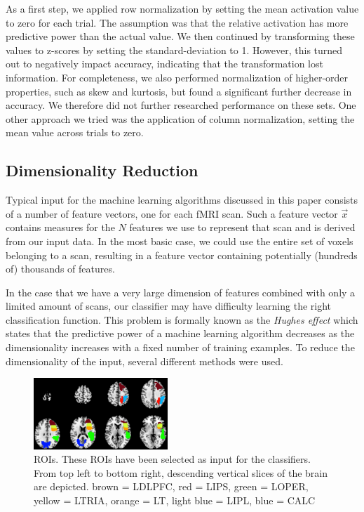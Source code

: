 \documentclass[preprint,journal,11pt]{vgtc}
\begin{document}
As a first step, we applied row normalization by setting the mean activation value to zero for each trial. The assumption was that the relative activation has more predictive power than the actual value. We then continued by transforming these values to z-scores by setting the standard-deviation to 1. However, this turned out to negatively impact accuracy, indicating that the transformation lost information. For completeness, we also performed normalization of higher-order properties, such as skew and kurtosis, but found a significant further decrease in accuracy. We therefore did not further researched performance on these sets. One other approach we tried was the application of column normalization, setting the mean value across trials to zero. 

\subsection{Dimensionality Reduction}
\label{sec:dimensionalityReduction}

Typical input for the machine learning algorithms discussed in this paper consists of a number of feature vectors, one for each fMRI scan. Such a feature vector $\vec{x}$ contains measures for the $N$ features we use to represent that scan and is derived from our input data. In the most basic case, we could use the entire set of voxels belonging to a scan, resulting in a feature vector containing potentially (hundreds of) thousands of features.

In the case that we have a very large dimension of features combined with only a limited amount of scans, our classifier may have difficulty learning the right classification function. This problem is formally known as the \emph{Hughes effect}\cite{Hughes1054102} which states that the predictive power of a machine learning algorithm decreases as the dimensionality increases with a fixed number of training examples. To reduce the dimensionality of the input, several different methods were used.

\begin{figure}
	\centering
	\includegraphics[width=0.45\textwidth]{figures/flying_dutchman}
  	\caption{ROIs. These ROIs have been selected as input for the classifiers. From top left to bottom right, descending vertical slices of the brain are depicted. brown = LDLPFC, red = LIPS, green = LOPER, yellow = LTRIA, orange = LT, light blue = LIPL, blue = CALC}
  	\label{fig:fd}
\end{figure}
\end{document}

